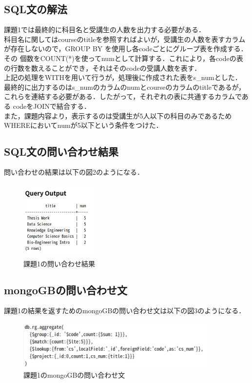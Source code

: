 \documentclass[dvipdfmx]{jarticle}
\begin{document}
\subsection{SQL文の解法}
課題1では最終的に科目名と受講生の人数を出力する必要がある．
\\科目名に関してはcourseのtitleを参照すればよいが，受講生の人数を表すカラムが存在しないので，GROUP BY を使用し各codeごとにグループ表を作成する．その
個数をCOUNT(*)を使ってnumとして計算する．これにより，各codeの表の行数を数えることができ，それはそのcodeの受講人数を表す．\\
上記の処理をWITHを用いて行うが，処理後に作成された表をs\_numとした．\\
最終的に出力するのはs\_numのカラムのnumとcourseのカラムのtitleであるが，これらを連結する必要がある．したがって，それぞれの表に共通するカラムである
codeをJOINで結合する．\\
また，課題内容より，表示するのは受講生が5人以下の科目のみであるためWHEREにおいてnumが5以下という条件をつけた．
\clearpage
\subsection{SQL文の問い合わせ結果}
問い合わせの結果は以下の図2のようになる．\\
\begin{figure}[h]
    \centering
    \includegraphics[width=4cm]{sqlresult1.png}
    \caption{課題1の問い合わせ結果}
\end{figure}
\subsection{mongoGBの問い合わせ文}
課題1の結果を返すためのmongoGBの問い合わせ文は以下の図3のようになる．\\
\begin{figure}[h]
    \centering
    \includegraphics[width=10cm]{mongo1_code.png}
    \caption{課題1のmongoGBの問い合わせ文}
\end{figure}
\end{document}

